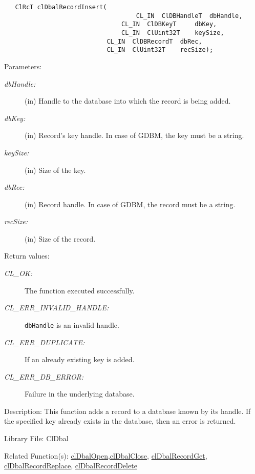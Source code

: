 \begin{flushleft}
\begin{Desc}
\footnotesize\begin{verbatim}   ClRcT clDbalRecordInsert(
                                	CL_IN  ClDBHandleT  dbHandle,
                    			CL_IN  ClDBKeyT     dbKey,
                    			CL_IN  ClUint32T    keySize,
                  			CL_IN  ClDBRecordT  dbRec,
                  			CL_IN  ClUint32T    recSize);
\end{verbatim}
\normalsize
\end{Desc}
\begin{Desc}
\item[Parameters:]
\begin{description}
\item[{\em db\-Handle:}](in) Handle to the database into which the record is being added. 
\item[{\em db\-Key:}](in) Record's key handle. In case of GDBM, the key must be a string. 
\item[{\em key\-Size:}](in) Size of the key. 
\item[{\em db\-Rec:}](in) Record handle. In case of GDBM, the record must be a string. 
\item[{\em rec\-Size:}](in) Size of the record.\end{description}
\end{Desc}
\begin{Desc}
\item[Return values:]
\begin{description}
\item[{\em CL\_\-OK:}]The function executed successfully. 
\item[{\em CL\_\-ERR\_\-INVALID\_\-HANDLE:}]{\tt{dbHandle}} is an invalid handle. 
\item[{\em CL\_\-ERR\_\-DUPLICATE:}]If an already existing key is added. 
\item[{\em CL\_\-ERR\_\-DB\_\-ERROR:}]Failure in the underlying database.\end{description}
\end{Desc}
\begin{Desc}
\item[Description:]This function adds a record to a database known by its handle. If the specified key already exists in the database, then an error is 
returned.\end{Desc}
\begin{Desc}
\item[Library File:]Cl\-Dbal\end{Desc}
\begin{Desc}
\item[Related Function(s):]\hyperlink{pagedbal103}{cl\-Dbal\-Open},\hyperlink{pagedbal104}{cl\-Dbal\-Close},
\hyperlink{pagedbal107}{cl\-Dbal\-Record\-Get}, \hyperlink{pagedbal106}{cl\-Dbal\-Record\-Replace},
\hyperlink{pagedbal108}{cl\-Dbal\-Record\-Delete} \end{Desc}



\end{flushleft}
